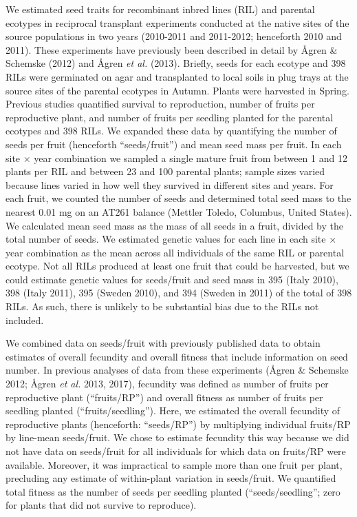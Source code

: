 \documentclass[]{article}
\begin{document}
We estimated seed traits for recombinant inbred lines (RIL) and parental ecotypes in reciprocal transplant experiments conducted at the native sites of the source populations in two years (2010-2011 and 2011-2012; henceforth 2010 and 2011). These experiments have previously been described in detail by Ågren \& Schemske (2012) and Ågren \emph{et al.} (2013). Briefly, seeds for each ecotype and 398 RILs were germinated on agar and transplanted to local soils in plug trays at the source sites of the parental ecotypes in Autumn. Plants were harvested in Spring. Previous studies quantified survival to reproduction, number of fruits per reproductive plant, and number of fruits per seedling planted for the parental ecotypes and 398 RILs. We expanded these data by quantifying the number of seeds per fruit (henceforth ``seeds/fruit'') and mean seed mass per fruit. In each site × year combination we sampled a single mature fruit from between 1 and 12 plants per RIL and between 23 and 100 parental plants; sample sizes varied because lines varied in how well they survived in different sites and years. For each fruit, we counted the number of seeds and determined total seed mass to the nearest 0.01 mg on an AT261 balance (Mettler Toledo, Columbus, United States). We calculated mean seed mass as the mass of all seeds in a fruit, divided by the total number of seeds. We estimated genetic values for each line in each site × year combination as the mean across all individuals of the same RIL or parental ecotype. Not all RILs produced at least one fruit that could be harvested, but we could estimate genetic values for seeds/fruit and seed mass in 395 (Italy 2010), 398 (Italy 2011), 395 (Sweden 2010), and 394 (Sweden in 2011) of the total of 398 RILs. As such, there is unlikely to be substantial bias due to the RILs not included.

We combined data on seeds/fruit with previously published data to obtain estimates of overall fecundity and overall fitness that include information on seed number. In previous analyses of data from these experiments (Ågren \& Schemske 2012; Ågren \emph{et al.} 2013, 2017), fecundity was defined as number of fruits per reproductive plant (``fruits/RP'') and overall fitness as number of fruits per seedling planted (``fruits/seedling''). Here, we estimated the overall fecundity of reproductive plants (henceforth: ``seeds/RP'') by multiplying individual fruits/RP by line-mean seeds/fruit. We chose to estimate fecundity this way because we did not have data on seeds/fruit for all individuals for which data on fruits/RP were available. Moreover, it was impractical to sample more than one fruit per plant, precluding any estimate of within-plant variation in seeds/fruit. We quantified total fitness as the number of seeds per seedling planted (``seeds/seedling''; zero for plants that did not survive to reproduce).
\end{document}
